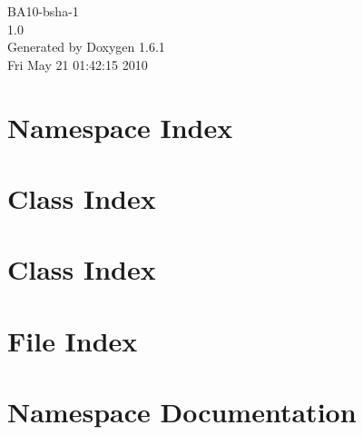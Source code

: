 \documentclass[a4paper]{book}
\begin{document}
\hypersetup{pageanchor=false}
\begin{titlepage}
\vspace*{7cm}
\begin{center}
{\Large BA10-\/bsha-\/1 \\[1ex]\large 1.0 }\\
\vspace*{1cm}
{\large Generated by Doxygen 1.6.1}\\
\vspace*{0.5cm}
{\small Fri May 21 01:42:15 2010}\\
\end{center}
\end{titlepage}
\clearemptydoublepage
{}
\tableofcontents
\clearemptydoublepage
{}
\hypersetup{pageanchor=true}
\chapter{Namespace Index}

\chapter{Class Index}

\chapter{Class Index}

\chapter{File Index}

\chapter{Namespace Documentation}







\end{document}
